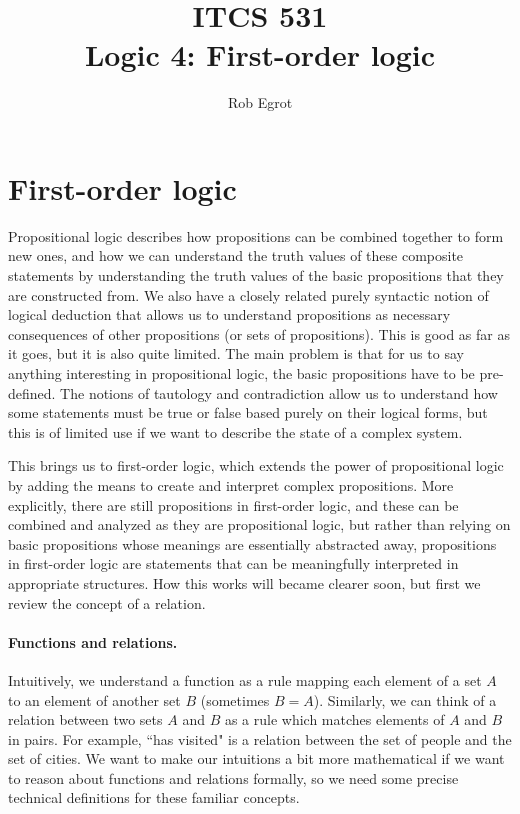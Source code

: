 \documentclass{article}
\title{ITCS 531 \\Logic 4: First-order logic}
\author{Rob Egrot}
\date{}
\theoremstyle{plain}
\begin{document}
\maketitle

\section{First-order logic}

Propositional logic describes how propositions can be combined together to form new ones, and how we can understand the truth values of these composite statements by understanding the truth values of the basic propositions that they are constructed from. We also have a closely related purely syntactic notion of logical deduction that allows us to understand propositions as necessary consequences of other propositions (or sets of propositions). This is good as far as it goes, but it is also quite limited. The main problem is that for us to say anything interesting in propositional logic, the basic propositions have to be pre-defined. The notions of tautology and contradiction allow us to understand how some statements must be true or false based purely on their logical forms, but this is of limited use if we want to describe the state of a complex system.

This brings us to first-order logic, which extends the power of propositional logic by adding the means to create and interpret complex propositions. More explicitly, there are still propositions in first-order logic, and these can be combined and analyzed as they are propositional logic, but rather than relying on basic propositions whose meanings are essentially abstracted away, propositions in first-order logic are statements that can be meaningfully interpreted in appropriate structures. How this works will became clearer soon, but first we review the concept of a relation.  
\paragraph{Functions and relations.}

Intuitively, we understand a function as a rule mapping each element of a set $A$ to an element of another set $B$ (sometimes $B=A$). Similarly, we can think of a relation between two sets $A$ and $B$ as a rule which matches elements of $A$ and $B$ in pairs. For example, ``has visited" is a relation between the set of people and the set of cities. We want to make our intuitions a bit more mathematical if we want to reason about functions and relations formally, so we need some precise technical definitions for these familiar concepts.
\end{document}
